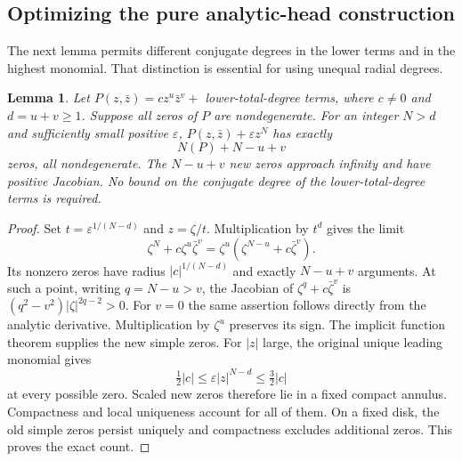 \documentclass[UTF8,11pt]{ctexart}
\newtheorem{lem}[thm]{Lemma}
\theoremstyle{definition}
\numberwithin{equation}{section}
\begin{document}
\subsection{Optimizing the pure analytic-head construction}\label{new:sec:pure}

The next lemma permits different conjugate degrees in the lower terms
and in the highest monomial. That distinction is essential for using
unequal radial degrees.

\begin{lem}\label{new:lem:completion}
Let $P(z,\bar z)=cz^u\bar z^v+$ lower-total-degree terms, where $c\ne0$
and $d=u+v\ge1$. Suppose all zeros of $P$ are nondegenerate.
For an integer $N>d$ and sufficiently small positive $\varepsilon$,
$P(z,\bar z)+\varepsilon z^N$ has exactly
\[
 N(P)+N-u+v
\]
zeros, all nondegenerate. The $N-u+v$ new zeros approach infinity and
have positive Jacobian. No bound on the conjugate degree of the
lower-total-degree terms is required.
\end{lem}
\begin{proof}
Set $t=\varepsilon^{1/(N-d)}$ and $z=\zeta/t$. Multiplication by $t^d$
gives the limit
\[
 \zeta^N+c\zeta^u\bar\zeta^v
 =\zeta^u(\zeta^{N-u}+c\bar\zeta^v).
\]
Its nonzero zeros have radius $|c|^{1/(N-d)}$ and exactly $N-u+v$
arguments. At such a point, writing $q=N-u>v$, the Jacobian of
$\zeta^q+c\bar\zeta^v$ is
$(q^2-v^2)|\zeta|^{2q-2}>0$.
For $v=0$ the same assertion follows directly from the analytic
derivative. Multiplication by $\zeta^u$ preserves its sign.
The implicit function theorem supplies the new simple zeros.
For $|z|$ large, the original unique leading monomial gives
\[
 \tfrac12|c|\le \varepsilon |z|^{N-d}\le\tfrac32|c|
\]
at every possible zero. Scaled new zeros therefore lie in a fixed
compact annulus. Compactness and local uniqueness account for all of
them. On a fixed disk, the old simple zeros persist uniquely and
compactness excludes additional zeros. This proves the exact count.
\end{proof}
\end{document}
